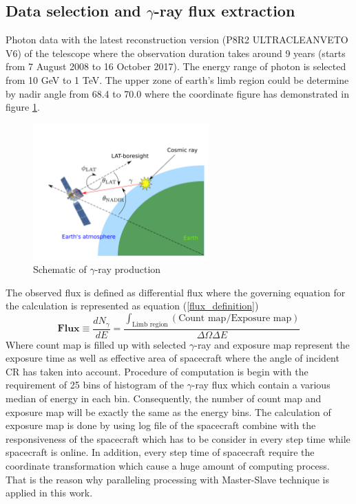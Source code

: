 \subsection{Data selection and $\gamma$-ray flux extraction}
Photon data with the latest reconstruction version (P8R2 ULTRACLEANVETO V6) of the telescope where the
observation duration takes around 9 years (starts from 7 August 2008 to 16 October 2017).
The energy range of photon is selected from 10 GeV
to 1 TeV. The upper zone of earth's limb region could be determine by
nadir angle from 68.4 to 70.0 where the coordinate figure has demonstrated in figure
\ref{gamma_production_schematic}.

\begin{figure}[h!]
    \centering
    \includegraphics[width=0.6\textwidth]{img/gamma_production_schematic}
    \caption{Schematic of $\gamma$-ray production}
    \label{gamma_production_schematic}
\end{figure}

The observed flux is defined as differential flux where the governing equation
for the calculation is represented as equation (\ref{flux_definition})
\begin{equation}
    \textbf{Flux} \equiv \frac{dN_\gamma}{dE} = \frac{\int_{\textrm{Limb region}}(\textrm{Count map}/\textrm{Exposure map})}{\Delta\Omega\Delta E }
    \label{flux_definition}
\end{equation}
Where count map is filled up with selected $\gamma$-ray and exposure map represent 
the exposure time as well as effective area of spacecraft where the angle of incident
CR has taken into account.
Procedure of computation is begin with the requirement of 25 bins of histogram of
the $\gamma$-ray flux which contain a various median of energy in each bin.
Consequently, the number of count map and exposure map will be exactly the same as
the energy bins. The calculation of exposure map is done by using log file of the
spacecraft combine with the responsiveness of the spacecraft which has to be consider
in every step time while spacecraft is online. In addition, every step time of spacecraft
require the coordinate transformation which cause a huge amount of computing process.
That is the reason why paralleling processing with Master-Slave technique is applied in this work.



